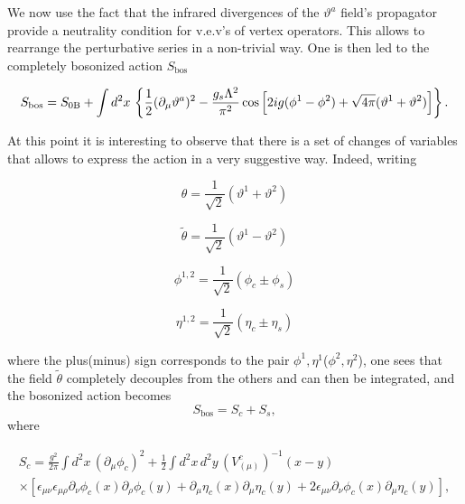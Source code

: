 \documentclass[a4paper,a4paper]{article}
\begin{document}
We now use the fact that the infrared divergences of the $\vartheta^a$ field's
propagator provide a neutrality condition for v.e.v's of vertex operators. This allows
to rearrange the perturbative series in a non-trivial way. One is then led to the
completely bosonized action $S_{\text{bos}}$

\begin{equation}
S_{\text{bos}}=S_{0\text{B}} + \int d^2x\,
\left\{\frac{1}{2}(\partial_\mu\vartheta^a)^2
-\frac{g_s\Lambda^2}{\pi^2}
\cos\left[2ig(\phi^1-\phi^2)+\sqrt{4\pi}(\vartheta^1+\vartheta^2)\right]\right\}.
\end{equation}

At this point it is interesting to observe that there is a set of changes of variables that allows to express the action
in a very suggestive way. Indeed, writing

\begin{equation}
\theta=\frac{1}{\sqrt{2}}(\vartheta^1+\vartheta^2)
\end{equation}

\begin{equation}
\tilde{\theta}=\frac{1}{\sqrt{2}}(\vartheta^1-\vartheta^2)
\end{equation}


\begin{equation}\label{scSep1}
\phi^{1,2}=\frac{1}{\sqrt{2}}(\phi_c\pm\phi_s)
\end{equation}

\begin{equation}\label{scSep2}
\eta^{1,2}=\frac{1}{\sqrt{2}}(\eta_c\pm\eta_s)
\end{equation}

\noindent where the plus(minus) sign corresponds to the pair
${\phi^1,\eta^1}$(${\phi^2,\eta^2}$), one sees that the field $\tilde{\theta}$
completely decouples from the others and can then be integrated, and the
bosonized action becomes
\begin{equation}
S_{\text{bos}}=S_c+S_s,
\end{equation}
where

\begin{multline}
S_c=\frac{g^2}{2\pi}\int d^2x\,(\partial_\mu\phi_c)^2
+\frac{1}{2}\int d^2x\,d^2y\,\left(V^c_{(\mu)}\right)^{-1}(x-y)\\
\times\left[\epsilon_{\mu\nu}\epsilon_{\mu\rho}\partial_\nu\phi_c(x)\partial_\rho\phi_c(y)
+\partial_\mu\eta_c(x)\partial_\mu\eta_c(y) +
2\epsilon_{\mu\nu}\partial_\nu\phi_c(x)\partial_\mu\eta_c(y)\right],
\end{multline}
\end{document}
